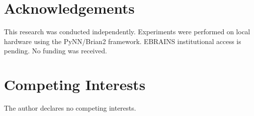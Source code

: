\documentclass{article}
\begin{document}
\section*{Acknowledgements}

This research was conducted independently. Experiments were performed on local hardware using the PyNN/Brian2 framework. EBRAINS institutional access is pending. No funding was received.

\section*{Competing Interests}
The author declares no competing interests.



\end{document}
